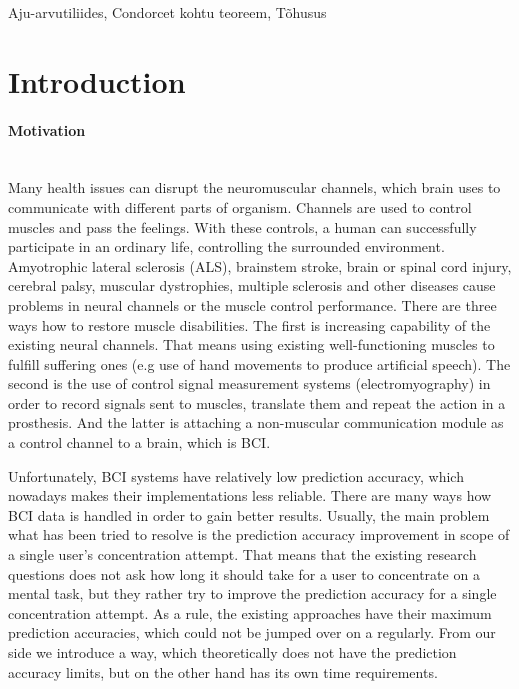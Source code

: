 \documentclass[12pt]{article}
\theoremstyle{definition}
\newcommand{\TODO}{\todo[inline]}
\begin{document}
\vspace*{3ex}
{}
Aju-arvutiliides, Condorcet kohtu teoreem, Tõhusus
\vspace*{3ex}




\newpage
\tableofcontents

\newpage
\section{Introduction}
\paragraph{Motivation}~\\

Many health issues can disrupt the neuromuscular channels, which brain uses to communicate with different parts of organism. Channels are used to control muscles and pass the feelings. With these controls, a human can successfully participate in an ordinary life, controlling the surrounded environment. Amyotrophic lateral sclerosis (ALS), brainstem stroke, brain or spinal cord injury, cerebral palsy, muscular dystrophies, multiple sclerosis and other diseases cause problems in neural channels or the muscle control performance. There are three ways how to restore muscle disabilities. The first is increasing capability of the existing neural channels. That means using existing well-functioning muscles to fulfill suffering ones (e.g use of hand movements to produce artificial speech). The second is the use of control signal measurement systems (electromyography) in order to record signals sent to muscles, translate them and repeat the action in a prosthesis. And the latter is attaching a non-muscular communication module as a control channel to a brain, which is BCI. \cite{bci_jonathan}

Unfortunately, BCI systems have relatively low prediction accuracy, which nowadays makes their implementations less reliable. There are many ways how BCI data is handled in order to gain better results. Usually, the main problem what has been tried to resolve is the prediction accuracy improvement in scope of a single user's concentration attempt. That means that the existing research questions does not ask how long it should take for a user to concentrate on a mental task, but they rather try to improve the prediction accuracy for a single concentration attempt. As a rule, the existing approaches have their maximum prediction accuracies, which could not be jumped over on a regularly. From our side we introduce a way, which theoretically does not have the prediction accuracy limits, but on the other hand has its own time requirements.
\end{document}
